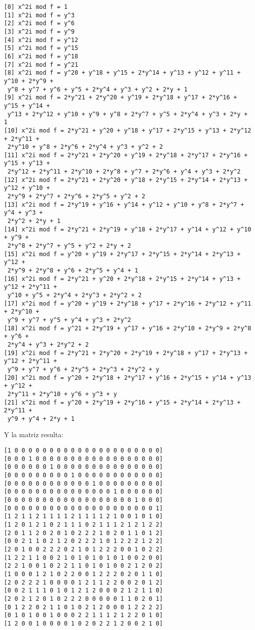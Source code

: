 \documentclass[a4paper]{article}
\begin{document}
\begin{verbatim}
[0] x^2i mod f = 1
[1] x^2i mod f = y^3
[2] x^2i mod f = y^6
[3] x^2i mod f = y^9
[4] x^2i mod f = y^12
[5] x^2i mod f = y^15
[6] x^2i mod f = y^18
[7] x^2i mod f = y^21
[8] x^2i mod f = y^20 + y^18 + y^15 + 2*y^14 + y^13 + y^12 + y^11 + y^10 + 2*y^9 +
 y^8 + y^7 + y^6 + y^5 + 2*y^4 + y^3 + y^2 + 2*y + 1
[9] x^2i mod f = 2*y^21 + 2*y^20 + y^19 + 2*y^18 + y^17 + 2*y^16 + y^15 + y^14 +
 y^13 + 2*y^12 + y^10 + y^9 + y^8 + 2*y^7 + y^5 + 2*y^4 + y^3 + 2*y + 1
[10] x^2i mod f = 2*y^21 + y^20 + y^18 + y^17 + 2*y^15 + y^13 + 2*y^12 + 2*y^11 +
 2*y^10 + y^8 + 2*y^6 + 2*y^4 + y^3 + y^2 + 2
[11] x^2i mod f = 2*y^21 + 2*y^20 + y^19 + 2*y^18 + 2*y^17 + 2*y^16 + y^15 + y^13 +
 2*y^12 + 2*y^11 + 2*y^10 + 2*y^8 + y^7 + 2*y^6 + y^4 + y^3 + 2*y^2
[12] x^2i mod f = 2*y^21 + 2*y^20 + y^18 + 2*y^15 + 2*y^14 + 2*y^13 + y^12 + y^10 +
 2*y^9 + 2*y^7 + 2*y^6 + 2*y^5 + y^2 + 2
[13] x^2i mod f = 2*y^19 + y^16 + y^14 + y^12 + y^10 + y^8 + 2*y^7 + y^4 + y^3 +
 2*y^2 + 2*y + 1
[14] x^2i mod f = 2*y^21 + 2*y^19 + y^18 + 2*y^17 + y^14 + y^12 + y^10 + y^9 +
 2*y^8 + 2*y^7 + y^5 + y^2 + 2*y + 2
[15] x^2i mod f = y^20 + y^19 + 2*y^17 + 2*y^15 + 2*y^14 + 2*y^13 + y^12 +
 2*y^9 + 2*y^8 + y^6 + 2*y^5 + y^4 + 1
[16] x^2i mod f = 2*y^21 + y^20 + 2*y^18 + 2*y^15 + 2*y^14 + y^13 + y^12 + 2*y^11 +
 y^10 + y^5 + 2*y^4 + 2*y^3 + 2*y^2 + 2
[17] x^2i mod f = y^20 + y^19 + 2*y^18 + y^17 + 2*y^16 + 2*y^12 + y^11 + 2*y^10 +
 y^9 + y^7 + y^5 + y^4 + y^3 + 2*y^2
[18] x^2i mod f = y^21 + 2*y^19 + y^17 + y^16 + 2*y^10 + 2*y^9 + 2*y^8 + y^6 +
 2*y^4 + y^3 + 2*y^2 + 2
[19] x^2i mod f = 2*y^21 + 2*y^20 + 2*y^19 + 2*y^18 + y^17 + 2*y^13 + y^12 + 2*y^11 +
 y^9 + y^7 + y^6 + 2*y^5 + 2*y^3 + 2*y^2 + y
[20] x^2i mod f = y^20 + 2*y^18 + 2*y^17 + y^16 + 2*y^15 + y^14 + y^13 + y^12 +
 2*y^11 + 2*y^10 + y^6 + y^3 + y
[21] x^2i mod f = y^20 + 2*y^19 + 2*y^16 + y^15 + 2*y^14 + 2*y^13 + 2*y^11 +
 y^9 + y^4 + 2*y + 1
\end{verbatim}

Y la matriz resulta:

\begin{verbatim}
[1 0 0 0 0 0 0 0 0 0 0 0 0 0 0 0 0 0 0 0 0 0]
[0 0 0 1 0 0 0 0 0 0 0 0 0 0 0 0 0 0 0 0 0 0]
[0 0 0 0 0 0 1 0 0 0 0 0 0 0 0 0 0 0 0 0 0 0]
[0 0 0 0 0 0 0 0 0 1 0 0 0 0 0 0 0 0 0 0 0 0]
[0 0 0 0 0 0 0 0 0 0 0 0 1 0 0 0 0 0 0 0 0 0]
[0 0 0 0 0 0 0 0 0 0 0 0 0 0 0 1 0 0 0 0 0 0]
[0 0 0 0 0 0 0 0 0 0 0 0 0 0 0 0 0 0 1 0 0 0]
[0 0 0 0 0 0 0 0 0 0 0 0 0 0 0 0 0 0 0 0 0 1]
[1 2 1 1 2 1 1 1 1 2 1 1 1 1 2 1 0 0 1 0 1 0]
[1 2 0 1 2 1 0 2 1 1 1 0 2 1 1 1 2 1 2 1 2 2]
[2 0 1 1 2 0 2 0 1 0 2 2 2 1 0 2 0 1 1 0 1 2]
[0 0 2 1 1 0 2 1 2 0 2 2 2 1 0 1 2 2 2 1 2 2]
[2 0 1 0 0 2 2 2 0 2 1 0 1 2 2 2 0 0 1 0 2 2]
[1 2 2 1 1 0 0 2 1 0 1 0 1 0 1 0 1 0 0 2 0 0]
[2 2 1 0 0 1 0 2 2 1 1 0 1 0 1 0 0 2 1 2 0 2]
[1 0 0 0 1 2 1 0 2 2 0 0 1 2 2 2 0 2 0 1 1 0]
[2 0 2 2 2 1 0 0 0 0 1 2 1 1 2 2 0 0 2 0 1 2]
[0 0 2 1 1 1 0 1 0 1 2 1 2 0 0 0 2 1 2 1 1 0]
[2 0 2 1 2 0 1 0 2 2 2 0 0 0 0 0 1 1 0 2 0 1]
[0 1 2 2 0 2 1 1 0 1 0 2 1 2 0 0 0 1 2 2 2 2]
[0 1 0 1 0 0 1 0 0 0 2 2 1 1 1 2 1 2 2 0 1 0]
[1 2 0 0 1 0 0 0 0 1 0 2 0 2 2 1 2 0 0 2 1 0]
\end{verbatim}
\end{document}
